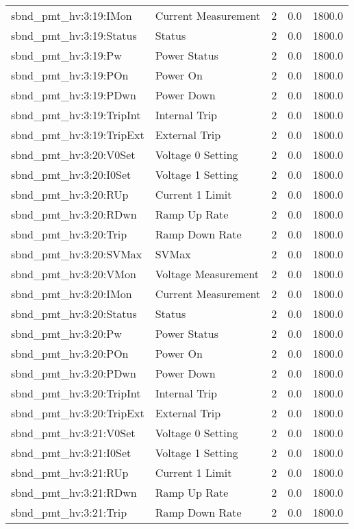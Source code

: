 \begin{center}
\begin{longtable}{l | l l l l }
sbnd\_pmt\_hv:3:19:IMon & Current Measurement & 2 & 0.0 & 1800.0\\ 
sbnd\_pmt\_hv:3:19:Status & Status & 2 & 0.0 & 1800.0\\ 
sbnd\_pmt\_hv:3:19:Pw & Power Status & 2 & 0.0 & 1800.0\\ 
sbnd\_pmt\_hv:3:19:POn & Power On & 2 & 0.0 & 1800.0\\ 
sbnd\_pmt\_hv:3:19:PDwn & Power Down & 2 & 0.0 & 1800.0\\ 
sbnd\_pmt\_hv:3:19:TripInt & Internal Trip & 2 & 0.0 & 1800.0\\ 
sbnd\_pmt\_hv:3:19:TripExt & External Trip & 2 & 0.0 & 1800.0\\ 
sbnd\_pmt\_hv:3:20:V0Set & Voltage 0 Setting & 2 & 0.0 & 1800.0\\ 
sbnd\_pmt\_hv:3:20:I0Set & Voltage 1 Setting & 2 & 0.0 & 1800.0\\ 
sbnd\_pmt\_hv:3:20:RUp & Current 1 Limit & 2 & 0.0 & 1800.0\\ 
sbnd\_pmt\_hv:3:20:RDwn & Ramp Up Rate & 2 & 0.0 & 1800.0\\ 
sbnd\_pmt\_hv:3:20:Trip & Ramp Down Rate & 2 & 0.0 & 1800.0\\ 
sbnd\_pmt\_hv:3:20:SVMax & SVMax & 2 & 0.0 & 1800.0\\ 
sbnd\_pmt\_hv:3:20:VMon & Voltage Measurement & 2 & 0.0 & 1800.0\\ 
sbnd\_pmt\_hv:3:20:IMon & Current Measurement & 2 & 0.0 & 1800.0\\ 
sbnd\_pmt\_hv:3:20:Status & Status & 2 & 0.0 & 1800.0\\ 
sbnd\_pmt\_hv:3:20:Pw & Power Status & 2 & 0.0 & 1800.0\\ 
sbnd\_pmt\_hv:3:20:POn & Power On & 2 & 0.0 & 1800.0\\ 
sbnd\_pmt\_hv:3:20:PDwn & Power Down & 2 & 0.0 & 1800.0\\ 
sbnd\_pmt\_hv:3:20:TripInt & Internal Trip & 2 & 0.0 & 1800.0\\ 
sbnd\_pmt\_hv:3:20:TripExt & External Trip & 2 & 0.0 & 1800.0\\ 
sbnd\_pmt\_hv:3:21:V0Set & Voltage 0 Setting & 2 & 0.0 & 1800.0\\ 
sbnd\_pmt\_hv:3:21:I0Set & Voltage 1 Setting & 2 & 0.0 & 1800.0\\ 
sbnd\_pmt\_hv:3:21:RUp & Current 1 Limit & 2 & 0.0 & 1800.0\\ 
sbnd\_pmt\_hv:3:21:RDwn & Ramp Up Rate & 2 & 0.0 & 1800.0\\ 
sbnd\_pmt\_hv:3:21:Trip & Ramp Down Rate & 2 & 0.0 & 1800.0\\ 

\end{longtable}
\end{center}
